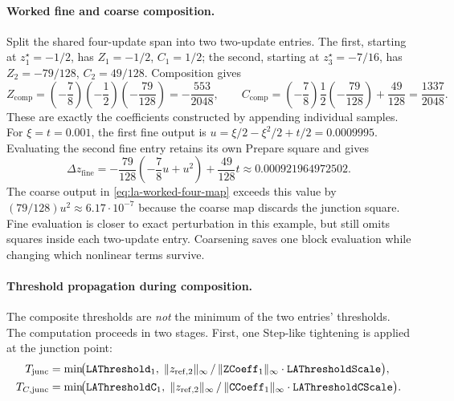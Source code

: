 \paragraph{Worked fine and coarse composition.}
Split the shared four-update span into two two-update entries. The first,
starting at $z_1^\star=-1/2$, has
$Z_1=-1/2$, $C_1=1/2$; the second, starting at $z_3^\star=-7/16$, has
$Z_2=-79/128$, $C_2=49/128$. Composition gives
\[
Z_{\mathrm{comp}}=\left(-\frac78\right)
 \left(-\frac12\right)\left(-\frac{79}{128}\right)
 =-\frac{553}{2048},
\qquad
C_{\mathrm{comp}}=\left(-\frac78\right)
 \frac12\left(-\frac{79}{128}\right)+\frac{49}{128}
 =\frac{1337}{2048}.
\]
These are exactly the coefficients constructed by appending individual samples.
For $\xi=t=0.001$, the first fine output is
$u=\xi/2-\xi^2/2+t/2=0.0009995$.
Evaluating the second fine entry retains its own Prepare square and gives
\[
\Delta z_{\mathrm{fine}}
 =-\frac{79}{128}\left(-\frac78u+u^2\right)+\frac{49}{128}t
 \approx0.000921964972502.
\]
The coarse output in \eqref{eq:la-worked-four-map} exceeds this value by
$(79/128)u^2\approx6.17\cdot10^{-7}$ because the coarse map discards the
junction square. Fine evaluation is closer to exact perturbation in this
example, but still omits squares inside each two-update entry. Coarsening saves
one block evaluation while changing which nonlinear terms survive.

\paragraph{Threshold propagation during composition.}
The composite thresholds are \emph{not} the minimum of the two
entries' thresholds.  The computation proceeds in two stages.  First,
one Step-like tightening is applied at the junction point:
\begin{align}
T_\mathrm{junc}
  &= \min\!\bigl(
       \texttt{LAThreshold}_1,\;
       \lVert z_\mathrm{ref,2} \rVert_\infty
       \,/\, \lVert \texttt{ZCoeff}_1 \rVert_\infty
       \cdot \texttt{LAThresholdScale}
     \bigr),
\label{eq:la-comp-thresh-junc}
\\
T_{C,\mathrm{junc}}
  &= \min\!\bigl(
       \texttt{LAThresholdC}_1,\;
       \lVert z_\mathrm{ref,2} \rVert_\infty
       \,/\, \lVert \texttt{CCoeff}_1 \rVert_\infty
       \cdot \texttt{LAThresholdCScale}
     \bigr).
\end{align}

